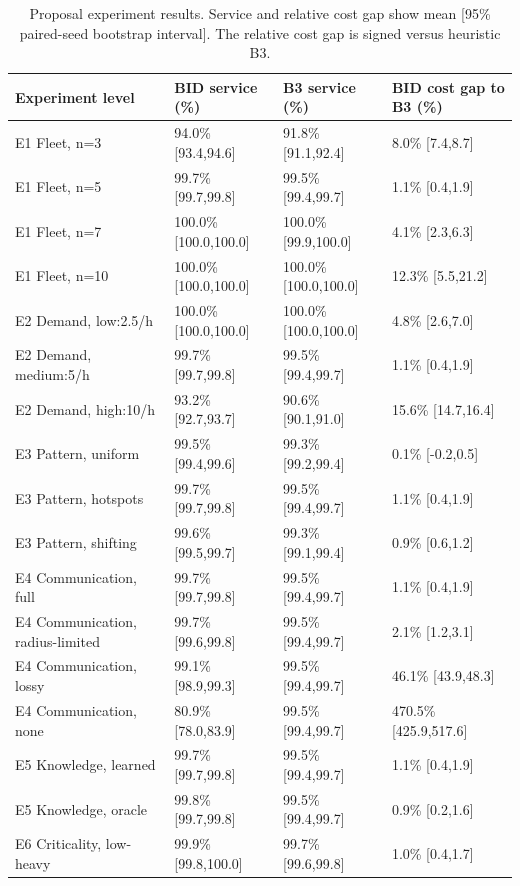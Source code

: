 \begin{table}[t]
\centering\scriptsize
\setlength{\tabcolsep}{3pt}
\caption{Proposal experiment results. Service and relative cost gap show mean [95\% paired-seed bootstrap interval]. The relative cost gap is signed versus heuristic B3.}
\label{tab:proposal-results}
\begin{tabular}{p{1.47in}p{1.47in}p{1.47in}p{1.47in}}
\toprule
Experiment level & BID service (\%) & B3 service (\%) & BID cost gap to B3 (\%) \\
\midrule
E1 Fleet, n=3 & 94.0\% [93.4,94.6] & 91.8\% [91.1,92.4] & 8.0\% [7.4,8.7] \\
E1 Fleet, n=5 & 99.7\% [99.7,99.8] & 99.5\% [99.4,99.7] & 1.1\% [0.4,1.9] \\
E1 Fleet, n=7 & 100.0\% [100.0,100.0] & 100.0\% [99.9,100.0] & 4.1\% [2.3,6.3] \\
E1 Fleet, n=10 & 100.0\% [100.0,100.0] & 100.0\% [100.0,100.0] & 12.3\% [5.5,21.2] \\
E2 Demand, low:2.5/h & 100.0\% [100.0,100.0] & 100.0\% [100.0,100.0] & 4.8\% [2.6,7.0] \\
E2 Demand, medium:5/h & 99.7\% [99.7,99.8] & 99.5\% [99.4,99.7] & 1.1\% [0.4,1.9] \\
E2 Demand, high:10/h & 93.2\% [92.7,93.7] & 90.6\% [90.1,91.0] & 15.6\% [14.7,16.4] \\
E3 Pattern, uniform & 99.5\% [99.4,99.6] & 99.3\% [99.2,99.4] & 0.1\% [-0.2,0.5] \\
E3 Pattern, hotspots & 99.7\% [99.7,99.8] & 99.5\% [99.4,99.7] & 1.1\% [0.4,1.9] \\
E3 Pattern, shifting & 99.6\% [99.5,99.7] & 99.3\% [99.1,99.4] & 0.9\% [0.6,1.2] \\
E4 Communication, full & 99.7\% [99.7,99.8] & 99.5\% [99.4,99.7] & 1.1\% [0.4,1.9] \\
E4 Communication, radius-limited & 99.7\% [99.6,99.8] & 99.5\% [99.4,99.7] & 2.1\% [1.2,3.1] \\
E4 Communication, lossy & 99.1\% [98.9,99.3] & 99.5\% [99.4,99.7] & 46.1\% [43.9,48.3] \\
E4 Communication, none & 80.9\% [78.0,83.9] & 99.5\% [99.4,99.7] & 470.5\% [425.9,517.6] \\
E5 Knowledge, learned & 99.7\% [99.7,99.8] & 99.5\% [99.4,99.7] & 1.1\% [0.4,1.9] \\
E5 Knowledge, oracle & 99.8\% [99.7,99.8] & 99.5\% [99.4,99.7] & 0.9\% [0.2,1.6] \\
E6 Criticality, low-heavy & 99.9\% [99.8,100.0] & 99.7\% [99.6,99.8] & 1.0\% [0.4,1.7] \\

\end{tabular}
\end{table}
